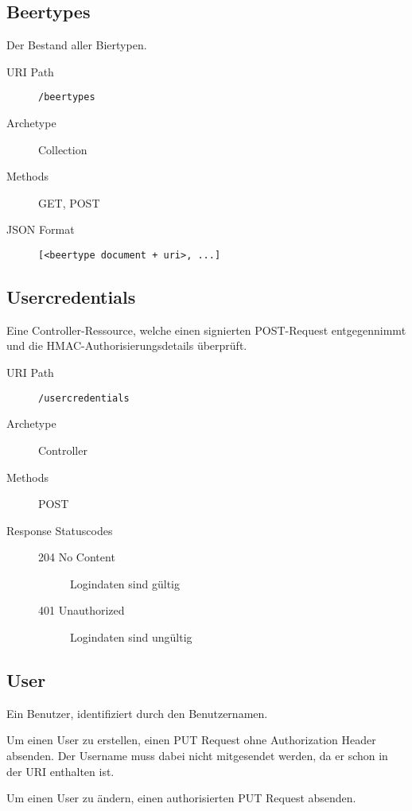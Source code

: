 \documentclass[10pt,a4paper]{scrartcl}
\begin{document}
\subsection{Beertypes}

Der Bestand aller Biertypen.

\begin{description}
	\item[URI Path] \texttt{/beertypes}
	\item[Archetype] Collection
	\item[Methods] GET, POST
	\item[JSON Format] \hfill
\begin{lstlisting}
[<beertype document + uri>, ...]
\end{lstlisting}
\end{description}

\subsection{Usercredentials}

Eine Controller-Ressource, welche einen signierten POST-Request entgegennimmt und die
HMAC-Authorisierungsdetails überprüft.

\begin{description}
	\item[URI Path] \texttt{/usercredentials}
	\item[Archetype] Controller
	\item[Methods] POST
	\item[Response Statuscodes] \hfill
		\begin{description}
			\item[204 No Content] Logindaten sind gültig
			\item[401 Unauthorized] Logindaten sind ungültig
		\end{description}
\end{description}


\subsection{User}

Ein Benutzer, identifiziert durch den Benutzernamen.

Um einen User zu erstellen, einen PUT Request ohne Authorization Header absenden. Der Username muss
dabei nicht mitgesendet werden, da er schon in der URI enthalten ist.

Um einen User zu ändern, einen authorisierten PUT Request absenden.
\end{document}

